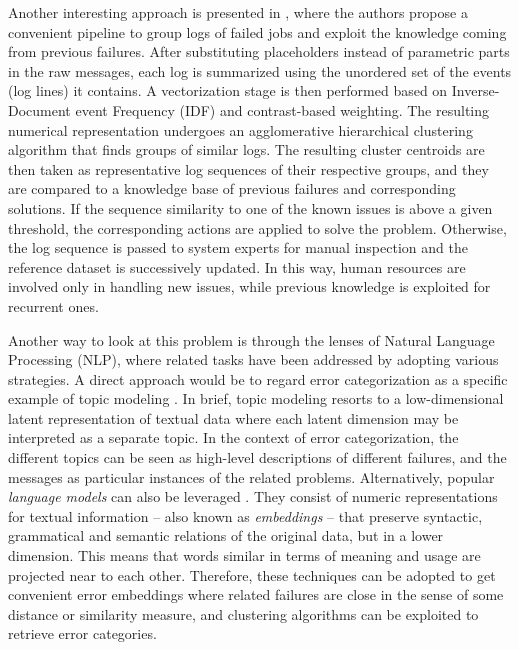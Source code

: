 Another interesting approach is presented in , where the authors propose a convenient pipeline to group logs of failed jobs and exploit the knowledge coming from previous failures.
After substituting placeholders instead of parametric parts in the raw messages, each log is summarized using the unordered set of the events (log lines) it contains.
A vectorization stage is then performed based on Inverse-Document event Frequency (IDF) and contrast-based weighting. 
The resulting numerical representation undergoes an agglomerative hierarchical clustering algorithm that finds groups of similar logs.
The resulting cluster centroids are then taken as representative log sequences of their respective groups, and they are compared to a knowledge base of previous failures and corresponding solutions. If the sequence similarity to one of the known issues is above a given threshold, the corresponding actions are applied to solve the problem. Otherwise, the log sequence is passed to system experts for manual inspection and the reference dataset is successively updated.
In this way, human resources are involved only in handling new issues, while previous knowledge is exploited for recurrent ones.

Another way to look at this problem is through the lenses of Natural Language Processing (NLP), where related tasks have been addressed by adopting various strategies.
A direct approach would be to regard error categorization as a specific example of topic modeling \cite{hofmann1999probabilistic, papadimitriou2000latent}.
In brief, topic modeling resorts to a low-dimensional latent representation of textual data where each latent dimension may be interpreted as a separate topic.
In the context of error categorization, the different topics can be seen as high-level descriptions of different failures, and the messages as particular instances of the related problems.
Alternatively, popular \textit{language models} can also be leveraged \cite{devlin2018bert, peters2018elmo, radford2019gpt2}.
They consist of numeric representations for textual information -- also known as \textit{embeddings} -- that preserve syntactic, grammatical and semantic relations of the original data, but in a lower dimension. 
This means that words similar in terms of meaning and usage are projected near to each other.
Therefore, these techniques can be adopted to get convenient error embeddings where related failures are close in the sense of some distance or similarity measure, and clustering algorithms can be exploited to retrieve error categories.

